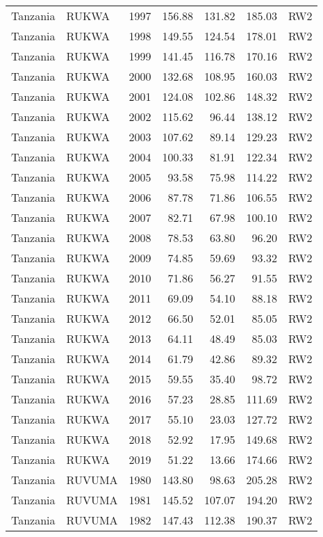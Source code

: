 \begin{longtable}{lllrrrl}
  Tanzania & RUKWA & 1997 & 156.88 & 131.82 & 185.03 & RW2 \\ 
  Tanzania & RUKWA & 1998 & 149.55 & 124.54 & 178.01 & RW2 \\ 
  Tanzania & RUKWA & 1999 & 141.45 & 116.78 & 170.16 & RW2 \\ 
  Tanzania & RUKWA & 2000 & 132.68 & 108.95 & 160.03 & RW2 \\ 
  Tanzania & RUKWA & 2001 & 124.08 & 102.86 & 148.32 & RW2 \\ 
  Tanzania & RUKWA & 2002 & 115.62 & 96.44 & 138.12 & RW2 \\ 
  Tanzania & RUKWA & 2003 & 107.62 & 89.14 & 129.23 & RW2 \\ 
  Tanzania & RUKWA & 2004 & 100.33 & 81.91 & 122.34 & RW2 \\ 
  Tanzania & RUKWA & 2005 & 93.58 & 75.98 & 114.22 & RW2 \\ 
  Tanzania & RUKWA & 2006 & 87.78 & 71.86 & 106.55 & RW2 \\ 
  Tanzania & RUKWA & 2007 & 82.71 & 67.98 & 100.10 & RW2 \\ 
  Tanzania & RUKWA & 2008 & 78.53 & 63.80 & 96.20 & RW2 \\ 
  Tanzania & RUKWA & 2009 & 74.85 & 59.69 & 93.32 & RW2 \\ 
  Tanzania & RUKWA & 2010 & 71.86 & 56.27 & 91.55 & RW2 \\ 
  Tanzania & RUKWA & 2011 & 69.09 & 54.10 & 88.18 & RW2 \\ 
  Tanzania & RUKWA & 2012 & 66.50 & 52.01 & 85.05 & RW2 \\ 
  Tanzania & RUKWA & 2013 & 64.11 & 48.49 & 85.03 & RW2 \\ 
  Tanzania & RUKWA & 2014 & 61.79 & 42.86 & 89.32 & RW2 \\ 
  Tanzania & RUKWA & 2015 & 59.55 & 35.40 & 98.72 & RW2 \\ 
  Tanzania & RUKWA & 2016 & 57.23 & 28.85 & 111.69 & RW2 \\ 
  Tanzania & RUKWA & 2017 & 55.10 & 23.03 & 127.72 & RW2 \\ 
  Tanzania & RUKWA & 2018 & 52.92 & 17.95 & 149.68 & RW2 \\ 
  Tanzania & RUKWA & 2019 & 51.22 & 13.66 & 174.66 & RW2 \\ 
  Tanzania & RUVUMA & 1980 & 143.80 & 98.63 & 205.28 & RW2 \\ 
  Tanzania & RUVUMA & 1981 & 145.52 & 107.07 & 194.20 & RW2 \\ 
  Tanzania & RUVUMA & 1982 & 147.43 & 112.38 & 190.37 & RW2 \\ 

\end{longtable}
